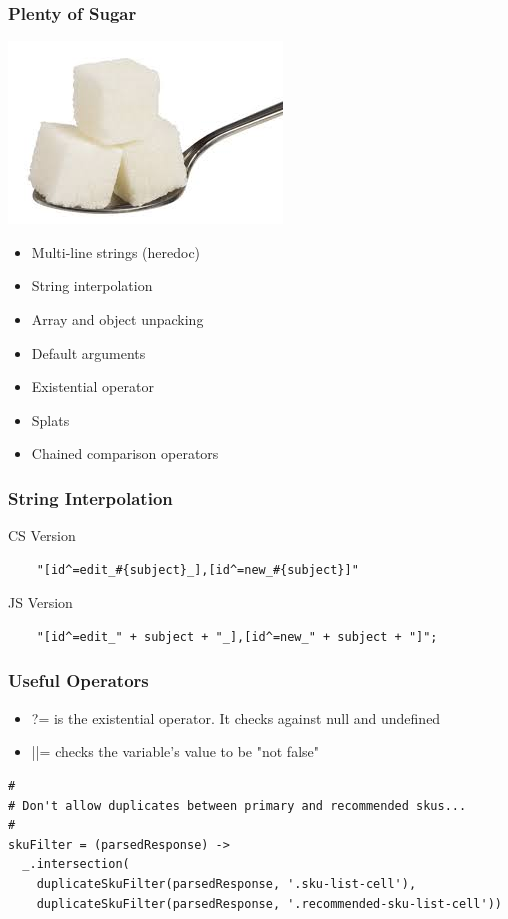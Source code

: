 \documentclass{beamer}
\begin{document}

\begin{frame}
  \frametitle{Plenty of Sugar}
  \includegraphics[scale=.40]{sugar}
  \begin{itemize}
    \item Multi-line strings (heredoc)
    \item String interpolation
    \item Array and object unpacking
    \item Default arguments
    \item Existential operator
    \item Splats
    \item Chained comparison operators
  \end{itemize}
\end{frame}

\begin{frame}[fragile]
  \frametitle{String Interpolation}
  CS Version
  \begin{verbatim}
    "[id^=edit_#{subject}_],[id^=new_#{subject}]"
  \end{verbatim}
  JS Version
  \begin{verbatim}
    "[id^=edit_" + subject + "_],[id^=new_" + subject + "]";
  \end{verbatim}  
\end{frame}

\begin{frame}
  \frametitle{Useful Operators}
  \begin{itemize}
    \item ?= is the existential operator. It checks against null and undefined
    \item ||= checks the variable's value to be "not false"
   \end{itemize}
\end{frame}


\begin{frame}[fragile]
\begin{verbatim}
#
# Don't allow duplicates between primary and recommended skus...
#
skuFilter = (parsedResponse) ->
  _.intersection(
    duplicateSkuFilter(parsedResponse, '.sku-list-cell'),
    duplicateSkuFilter(parsedResponse, '.recommended-sku-list-cell'))
\end{verbatim}
\end{frame}
\end{document}
